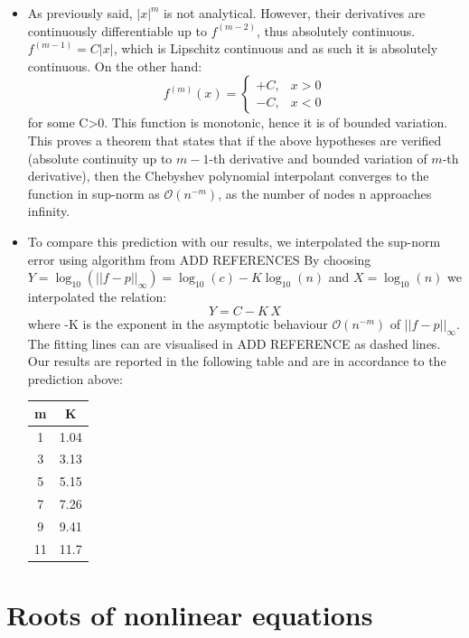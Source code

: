 \documentclass[a4paper,11]{article}
\begin{document}
\begin{itemize}
	\item{
		As previously said, $|x|^{m}$ is not analytical. However, their 
		derivatives are continuously differentiable up to $f^{(m-2)}$, 
		thus absolutely continuous. $f^{(m-1)} = C|x|$, which is Lipschitz
		continuous and as such it is absolutely continuous. On the other hand:
		\[
			f^{(m)}(x) = \begin{cases}
			  +C, & x > 0 \\
			  -C,  & x < 0
			  \end{cases}
		\]
		for some C>0. This function is monotonic, hence it is of bounded variation. This
		proves a theorem that states that if the above hypotheses are verified (absolute
		continuity up to $m-1$-th derivative and bounded variation of $m$-th 
		derivative), then the Chebyshev polynomial interpolant converges to the function
		in sup-norm as $\mathcal{O}(n^{-m})$, as the number of nodes n approaches 
		infinity.
	}
	\item{
		To compare this prediction with our results, we interpolated the 
		sup-norm error using algorithm from ADD REFERENCES
		By choosing $Y=\log_{10}(||f-p||_{\infty}) = \log_{10}(c) - K\log_{10}(n)$ 
		and $X = \log_{10}(n)$ we
		interpolated the relation:
		\[
			Y = C - K\,X
		\]
		where -K is the exponent in the asymptotic behaviour $\mathcal{O}(n^{-m})$
		of $||f-p||_{\infty}$. The fitting lines can are visualised in ADD REFERENCE
		as dashed lines. Our results are reported in the following table 
		and are in accordance to the prediction above:
		\begin{table}[ht]
			\centering
			\begin{tabular}{c|c}
				m & K \\
				\hline
				1 &  1.04\\
				3 &  3.13\\
				5 &  5.15\\
				7 &  7.26\\
				9 & 9.41\\
				11 & 11.7
			\end{tabular}
		\end{table}
	}
\end{itemize}




\section{Roots of nonlinear equations}
\end{document}
